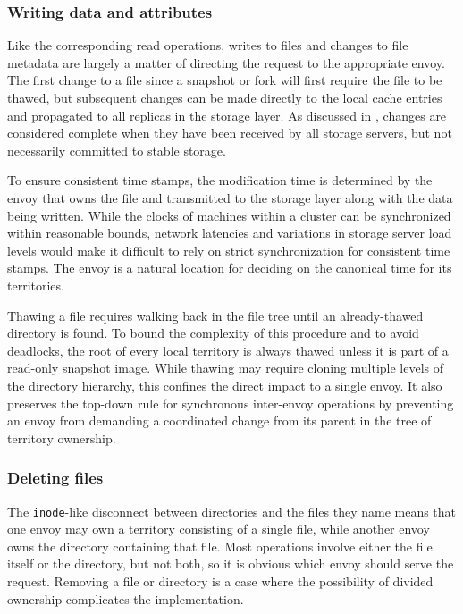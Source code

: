 \subsubsection{Writing data and attributes}

Like the corresponding read operations, writes to files and changes to file metadata are largely a matter of directing the request to the appropriate envoy. The first change to a file since a snapshot or fork will first require the file to be thawed, but subsequent changes can be made directly to the local cache entries and propagated to all replicas in the storage layer. As discussed in , changes are considered complete when they have been received by all storage servers, but not necessarily committed to stable storage.

To ensure consistent time stamps, the modification time is determined by the envoy that owns the file and transmitted to the storage layer along with the data being written. While the clocks of machines within a cluster can be synchronized within reasonable bounds, network latencies and variations in storage server load levels would make it difficult to rely on strict synchronization for consistent time stamps. The envoy is a natural location for deciding on the canonical time for its territories.

Thawing a file requires walking back in the file tree until an already-thawed directory is found. To bound the complexity of this procedure and to avoid deadlocks, the root of every local territory is always thawed unless it is part of a read-only snapshot image. While thawing may require cloning multiple levels of the directory hierarchy, this confines the direct impact to a single envoy. It also preserves the top-down rule for synchronous inter-envoy operations by preventing an envoy from demanding a coordinated change from its parent in the tree of territory ownership.

\subsubsection{Deleting files}

The \texttt{inode}-like disconnect between directories and the files they name means that one envoy may own a territory consisting of a single file, while another envoy owns the directory containing that file. Most operations involve either the file itself or the directory, but not both, so it is obvious which envoy should serve the request. Removing a file or directory is a case where the possibility of divided ownership complicates the implementation.

